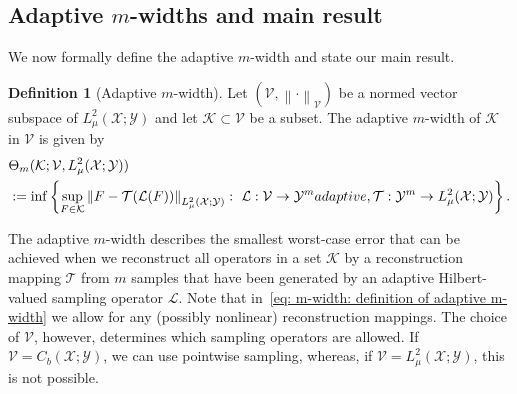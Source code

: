 \documentclass[namedate,webpdf]{ima-authoring-template-blank}
\newcommand*{\nm}[1]{{\left\|#1\right \|}}
\newcounter{counter}
\numberwithin{counter}{section}
\numberwithin{equation}{section}
\theoremstyle{plain}
\theoremstyle{definition}
\newtheorem{definition}[counter]{Definition}
\newcommand*{\cK}{\mathcal{K}}
\newcommand*{\cL}{\mathcal{L}}
\newcommand*{\cT}{\mathcal{T}}
\newcommand*{\cV}{\mathcal{V}}
\newcommand*{\cX}{\mathcal{X}}
\newcommand*{\cY}{\mathcal{Y}}
\theoremstyle{thmstyletwo}
\begin{document}
\subsection{Adaptive \texorpdfstring{\(m\)}{m}-widths and main result}
\label{subsec: adaptive widths and main result}

We now formally define the adaptive \(m\)-width and state our main result.

\begin{definition}[Adaptive \(m\)-width]
    Let \((\cV,\nm{\cdot}_{\cV})\) be a normed vector subspace of \(L_{\mu}^2(\cX;\cY)\) and let \(\cK \subset \cV\) be a subset.
    The adaptive \(m\)-width of \(\cK\) in \(\cV\) is given by
    \begin{align}
    \begin{split}
    \label{eq: m-width: definition of adaptive m-width}
        &\Theta_m(\cK;\cV,L_{\mu}^2(\cX; \cY)) \\
        &:= \inf\left\{
        \sup_{F \in \cK} \nm{F - \cT(\cL(F))}_{L_{\mu}^2(\cX; \cY)} : \ \cL: \cV \to \cY^m \textup{ adaptive}, \cT: \cY^m \to L_{\mu}^2(\cX; \cY)
        \right\}.
    \end{split}
    \end{align}
\end{definition}

The adaptive \(m\)-width describes the smallest worst-case error that can be achieved when we reconstruct all operators in a set \(\cK\) by a reconstruction mapping \(\cT\) from \(m\) samples that have been generated by an adaptive Hilbert-valued sampling operator \(\cL\). Note that in~\eqref{eq: m-width: definition of adaptive m-width} we allow for any (possibly nonlinear) reconstruction mappings. The choice of \(\cV\), however, determines which sampling operators are allowed. If \(\cV = C_b(\cX; \cY)\), we can use pointwise sampling, whereas, if \(\cV = L_{\mu}^2(\cX; \cY)\), this is not possible.
\end{document}
